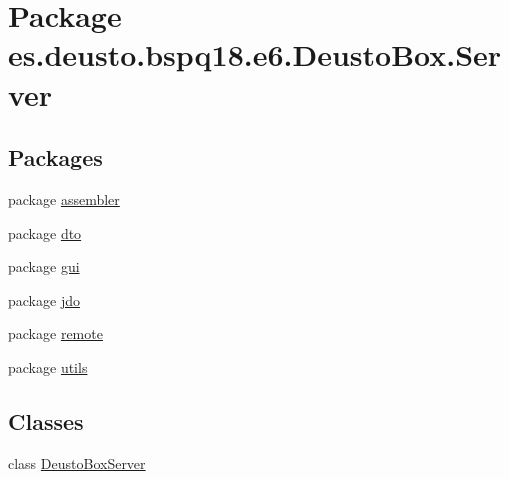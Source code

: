 \hypertarget{namespacees_1_1deusto_1_1bspq18_1_1e6_1_1_deusto_box_1_1_server}{}\section{Package es.\+deusto.\+bspq18.\+e6.\+Deusto\+Box.\+Server}
\label{namespacees_1_1deusto_1_1bspq18_1_1e6_1_1_deusto_box_1_1_server}
\subsection*{Packages}
\begin{DoxyCompactItemize}
\item 
package \mbox{\hyperlink{namespacees_1_1deusto_1_1bspq18_1_1e6_1_1_deusto_box_1_1_server_1_1assembler}{assembler}}
\item 
package \mbox{\hyperlink{namespacees_1_1deusto_1_1bspq18_1_1e6_1_1_deusto_box_1_1_server_1_1dto}{dto}}
\item 
package \mbox{\hyperlink{namespacees_1_1deusto_1_1bspq18_1_1e6_1_1_deusto_box_1_1_server_1_1gui}{gui}}
\item 
package \mbox{\hyperlink{namespacees_1_1deusto_1_1bspq18_1_1e6_1_1_deusto_box_1_1_server_1_1jdo}{jdo}}
\item 
package \mbox{\hyperlink{namespacees_1_1deusto_1_1bspq18_1_1e6_1_1_deusto_box_1_1_server_1_1remote}{remote}}
\item 
package \mbox{\hyperlink{namespacees_1_1deusto_1_1bspq18_1_1e6_1_1_deusto_box_1_1_server_1_1utils}{utils}}
\end{DoxyCompactItemize}
\subsection*{Classes}
\begin{DoxyCompactItemize}
\item 
class \mbox{\hyperlink{classes_1_1deusto_1_1bspq18_1_1e6_1_1_deusto_box_1_1_server_1_1_deusto_box_server}{Deusto\+Box\+Server}}
\end{DoxyCompactItemize}
